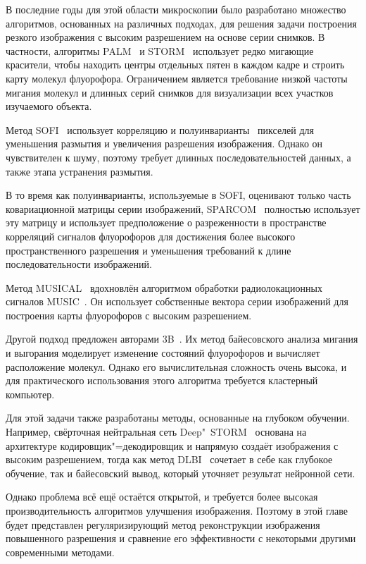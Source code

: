 В последние годы для этой области микроскопии было разработано множество алгоритмов, основанных на различных подходах, для решения задачи построения резкого изображения с высоким разрешением на основе серии снимков. В частности, алгоритмы PALM~\cite{betzig2006imaging} и STORM~\cite{rust2006sub} использует редко мигающие красители, чтобы находить центры отдельных пятен в каждом кадре и строить карту молекул флуорофора. Ограничением является требование низкой частоты мигания молекул и длинных серий снимков для визуализации всех участков изучаемого объекта.

Метод SOFI~\cite{dertinger2009fast, dertinger2010achieving} использует корреляцию и полуинварианты~\cite{75086, малахов1978кумулянтный} пикселей для уменьшения размытия и увеличения разрешения изображения. Однако он чувствителен к шуму, поэтому требует длинных последовательностей данных, а также этапа устранения размытия.

В то время как полуинварианты, используемые в SOFI, оценивают только часть ковариационной матрицы серии изображений, SPARCOM~\cite{Solomon:18} полностью использует эту матрицу и использует предположение о разреженности в пространстве корреляций сигналов флуорофоров для достижения более высокого пространственного разрешения и уменьшения требований к длине последовательности изображений.

Метод MUSICAL~\cite{agarwal2016multiple} вдохновлён алгоритмом обработки радиолокационных сигналов MUSIC~\cite{schmidt1986multiple}. Он использует собственные вектора серии изображений для построения карты флуорофоров с высоким разрешением.

Другой подход предложен авторами 3B~\cite{cox2012bayesian}. Их метод байесовского анализа мигания и выгорания моделирует изменение состояний флуорофоров и вычисляет расположение молекул. Однако его вычислительная сложность очень высока, и для практического использования этого алгоритма требуется кластерный компьютер.

Для этой задачи также разработаны методы, основанные на глубоком обучении. Например, свёрточная нейтральная сеть Deep"~STORM~\cite{Nehme:18} основана на архитектуре кодировщик"=декодировщик и напрямую создаёт изображения с высоким разрешением, тогда как метод DLBI~\cite{10.1093/bioinformatics/bty241} сочетает в себе как глубокое обучение, так и байесовский вывод, который уточняет результат нейронной сети. 

Однако проблема всё ещё остаётся открытой, и требуется более высокая производительность алгоритмов улучшения изображения. Поэтому в этой главе будет представлен регуляризирующий метод реконструкции изображения повышенного разрешения и сравнение его эффективности с некоторыми другими современными методами.

